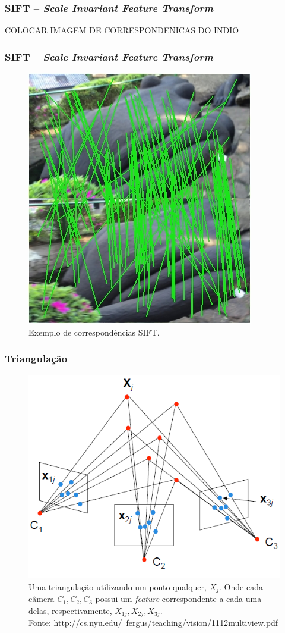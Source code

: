 \documentclass[table, usenames, svgnames, xcolor=dvipsnames]{beamer}
\begin{document}
\begin{frame}
\frametitle{\textbf{SIFT -- \emph{Scale Invariant Feature Transform}}}
	\begin{center}		
		COLOCAR IMAGEM DE CORRESPONDENICAS DO INDIO
	\end{center}
\end{frame}



\begin{frame}
\frametitle{\textbf{SIFT -- \emph{Scale Invariant Feature Transform}}}
	\begin{center}		
		\begin{figure}[!h]
			\centering
			\includegraphics[width=0.5\linewidth]{figs/SIFTsapo2.jpg}
			\caption{%
				Exemplo de correspondências SIFT. \\
			}
		\end{figure}
	\end{center}
\end{frame}

\begin{frame}
\frametitle{\textbf{Triangulação}}
	\begin{center}
		\begin{figure} [!h]
			\centering
			\includegraphics[width=0.45\linewidth]{figs/triangulacao.png}
			\caption{%
				Uma triangulação utilizando um ponto qualquer, $X_j$. Onde cada câmera $C_1, C_2, C_3$ possui um \emph{feature} correspondente a cada uma delas, respectivamente, $X_{1j}, X_{2j}, X_{3j}$. \\
				\tiny{Fonte: http://cs.nyu.edu/~fergus/teaching/vision/11\underline{\space}12\underline{\space}multiview.pdf}
		}
		\end{figure}
	\end{center}
\end{frame}
\end{document}
